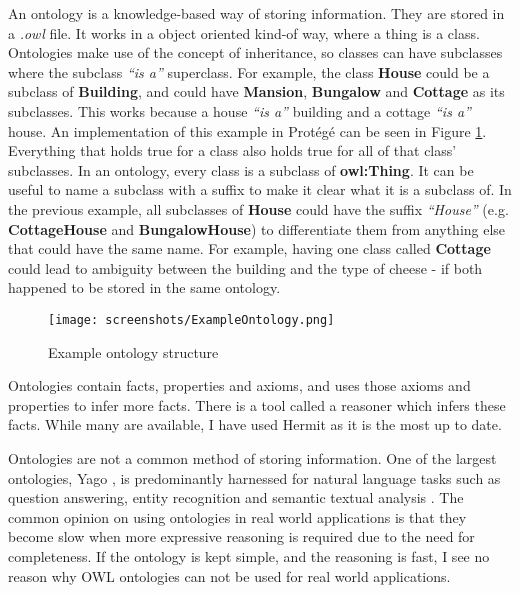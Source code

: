 An ontology is a knowledge-based way of storing information. They are stored in a \textit{.owl} file. It works in a object oriented kind-of way, where a thing is a class. Ontologies make use of the concept of inheritance, so classes can have subclasses where the subclass \textit{``is a''} superclass. For example, the class \textbf{House} could be a subclass of \textbf{Building}, and could have \textbf{Mansion}, \textbf{Bungalow} and \textbf{Cottage} as its subclasses. This works because a house \textit{``is a''} building and a cottage \textit{``is a''} house. An implementation of this example in Protégé can be seen in Figure \ref{fig:example_ontology}. Everything that holds true for a class also holds true for all of that class' subclasses. In an ontology, every class is a subclass of \textbf{owl:Thing}. It can be useful to name a subclass with a suffix to make it clear what it is a subclass of. In the previous example, all subclasses of \textbf{House} could have the suffix \textit{``House''} (e.g. \textbf{CottageHouse} and \textbf{BungalowHouse}) to differentiate them from anything else that could have the same name. For example, having one class called \textbf{Cottage} could lead to ambiguity between the building and the type of cheese - if both happened to be stored in the same ontology. 

\begin{figure}[h]
    \centering
    \captionsetup{justification=centering}
    \texttt{[image: screenshots/ExampleOntology.png]}
    \caption{Example ontology structure}
    \label{fig:example_ontology}
\end{figure}

Ontologies contain facts, properties and axioms, and uses those axioms and properties to infer more facts. There is a tool called a reasoner which infers these facts. While many are available, I have used Hermit \cite{hermit} as it is the most up to date.

Ontologies are not a common method of storing information. One of the largest ontologies, Yago \cite{suchanek_abiteboul_manolescu_rigaux_rousset_senellart_2011} , is predominantly harnessed for natural language tasks such as question answering, entity recognition and semantic textual analysis \cite{pellissier2020yago}. The common opinion on using ontologies in real world applications is that they become slow when more expressive reasoning is required \cite{srinivas2009owl, weithoner2007real} due to the need for completeness. If the ontology is kept simple, and the reasoning is fast, I see no reason why OWL ontologies can not be used for real world applications.

